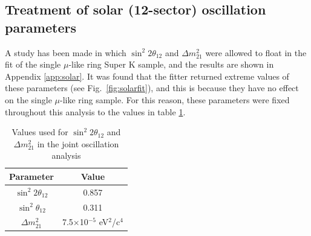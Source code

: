 \subsection* {Treatment of solar (12-sector) oscillation parameters}

A study has been made in which $\sin^{2}2\theta_{12}$ and $\Delta m_{21}^{2}$ were allowed to float in the fit of the single $\mu$-like ring Super K sample, and 
the results are shown in Appendix \ref{app:solar}. It was found that the fitter returned extreme values of these parameters (see Fig.\ \ref{fig:solarfit}), and 
this is because they have no effect on the single $\mu$-like ring sample. For this reason, these parameters were fixed throughout this analysis to the values 
in table \ref{tab:solarparameters}.

\begin{table}[h]
\centering
\begin{tabular}{|c|c|}
\hline
Parameter & Value \\
\hline
\hline
$\sin^{2}2\theta_{12}$ & 0.857 \\
\hline 
$\sin^{2}\theta_{12}$ & 0.311 \\
\hline 
$\Delta m_{21}^{2}$ & 7.5$\times$10$^{-5}$ eV$^{2}$/c$^{4}$ \\
\hline
\end{tabular}
\caption{Values used for $\sin^{2}2\theta_{12}$ and $\Delta m_{21}^{2}$ in the joint oscillation analysis}
\label{tab:solarparameters}
\end{table}



